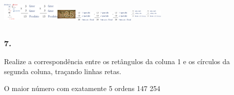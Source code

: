 \includegraphics[width=0.33336in,height=0.50004in]{media/image13.png}\includegraphics[width=0.39170in,height=0.51671in]{media/image12.png}\includegraphics[width=0.39170in,height=0.51671in]{media/image12.png}\includegraphics[width=0.37503in,height=0.40003in]{media/image9.png}\includegraphics[width=0.38337in,height=0.31669in]{media/image10.png}\includegraphics[width=0.38337in,height=0.31669in]{media/image10.png}\includegraphics[width=0.38337in,height=0.31669in]{media/image10.png}\includegraphics[width=0.31669in,height=0.41670in]{media/image11.png}\includegraphics[width=0.31669in,height=0.41670in]{media/image11.png}

\subsubsection{7.}\label{section-6}

Realize a correspondência entre os retângulos da coluna 1 e os círculos
da segunda coluna, traçando linhas retas.

O maior número com exatamente 5 ordens 147 254

